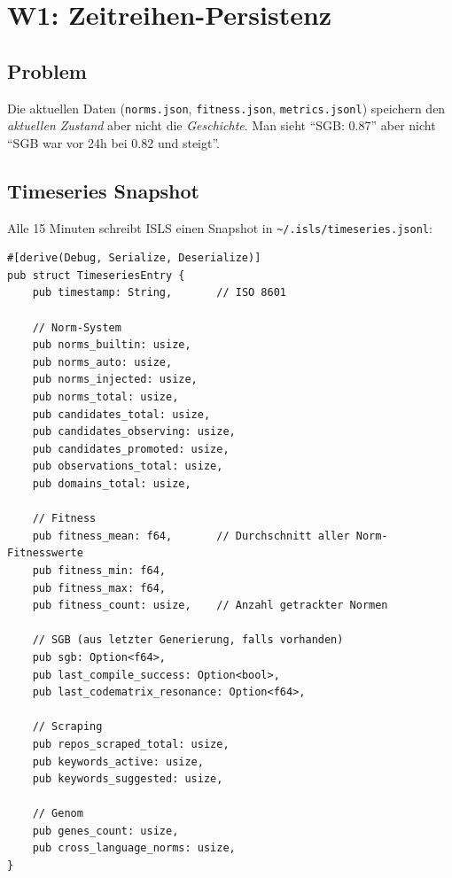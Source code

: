\documentclass[11pt,a4paper]{article}
\begin{document}
\section{W1: Zeitreihen-Persistenz}
\label{sec:w1}

\subsection{Problem}

Die aktuellen Daten (\texttt{norms.json}, \texttt{fitness.json}, 
\texttt{metrics.jsonl}) speichern den \emph{aktuellen Zustand} 
aber nicht die \emph{Geschichte}. Man sieht ``SGB: 0.87'' aber 
nicht ``SGB war vor 24h bei 0.82 und steigt''.

\subsection{Timeseries Snapshot}

Alle 15 Minuten schreibt ISLS einen Snapshot in 
\texttt{\textasciitilde/.isls/timeseries.jsonl}:

\begin{lstlisting}[style=rust]
#[derive(Debug, Serialize, Deserialize)]
pub struct TimeseriesEntry {
    pub timestamp: String,       // ISO 8601
    
    // Norm-System
    pub norms_builtin: usize,
    pub norms_auto: usize,
    pub norms_injected: usize,
    pub norms_total: usize,
    pub candidates_total: usize,
    pub candidates_observing: usize,
    pub candidates_promoted: usize,
    pub observations_total: usize,
    pub domains_total: usize,
    
    // Fitness
    pub fitness_mean: f64,       // Durchschnitt aller Norm-Fitnesswerte
    pub fitness_min: f64,
    pub fitness_max: f64,
    pub fitness_count: usize,    // Anzahl getrackter Normen
    
    // SGB (aus letzter Generierung, falls vorhanden)
    pub sgb: Option<f64>,
    pub last_compile_success: Option<bool>,
    pub last_codematrix_resonance: Option<f64>,
    
    // Scraping
    pub repos_scraped_total: usize,
    pub keywords_active: usize,
    pub keywords_suggested: usize,
    
    // Genom
    pub genes_count: usize,
    pub cross_language_norms: usize,
}
\end{lstlisting}
\end{document}
